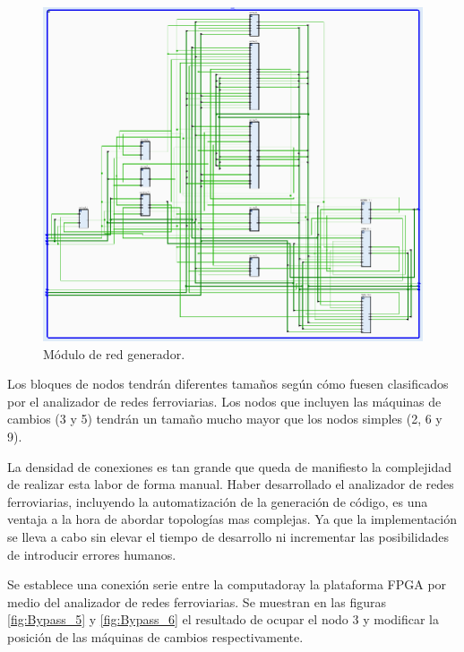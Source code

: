	\begin{figure}[h]
	\centering
	\includegraphics[scale=0.5]{./Figures/Red}
		\caption{Módulo de red generador.}
		\label{fig:Bypass_4}
	\end{figure}
	
	Los bloques de nodos tendrán diferentes tamaños según cómo fuesen clasificados por el analizador de redes ferroviarias. Los nodos que incluyen las máquinas de cambios (3 y 5) tendrán un tamaño mucho mayor que los nodos simples (2, 6 y 9).
	
	La densidad de conexiones es tan grande que queda de manifiesto la complejidad de realizar esta labor de forma manual. Haber desarrollado el analizador de redes ferroviarias, incluyendo la automatización de la generación de código, es una ventaja a la hora de abordar topologías mas complejas. Ya que la implementación se lleva a cabo sin elevar el tiempo de desarrollo ni incrementar las posibilidades de introducir errores humanos.
	
	Se establece una conexión serie entre la computadoray la plataforma FPGA por medio del analizador de redes ferroviarias. Se muestran en las figuras \ref{fig:Bypass_5} y \ref{fig:Bypass_6} el resultado de ocupar el nodo 3 y modificar la posición de las máquinas de cambios respectivamente.
	

